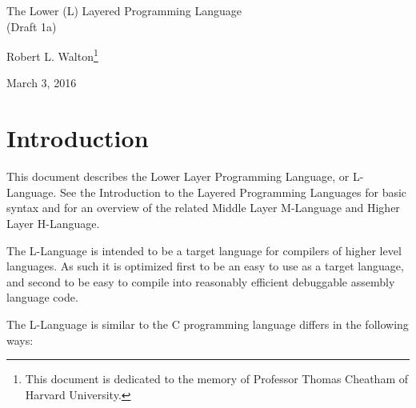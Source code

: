 \documentclass[12pt]{article}
\makeatletter
\renewcommand\tableofcontents{%
    \begin{list}{}%
	     {\setlength{\itemsep}{0in}%
	      \setlength{\topsep}{0in}%
	      \setlength{\parsep}{1ex}%
	      \setlength{\labelwidth}{0in}%
	      \setlength{\baselineskip}{1.5ex}%
	      \setlength{\leftmargin}{1.0in}%
	      \setlength{\rightmargin}{1.0in}}%
    \item\@starttoc{toc}%
    \end{list}}
\makeatother
\begin{document}
        
\begin{center}

{\Large
The Lower (L) Layered Programming Language \\[0.5ex]
(Draft 1a)}

\medskip

Robert L. Walton\footnote{This document is dedicated to the memory
of Professor Thomas Cheatham of Harvard University.}

March 3, 2016
 
\end{center}

{\small \tableofcontents}

\newpage

\section{Introduction}

This document describes the Lower Layer Programming Language, or
L-Language.  See the Introduction to the Layered
Programming Languages for basic syntax and for an overview of the related
Middle Layer M-Language and Higher Layer H-Language.

The L-Language is intended to be a target language for compilers of
higher level languages.  As such it is optimized first to be an easy to 
use as a target language, and second to be easy to
compile into reasonably efficient debuggable assembly language code.

The L-Language is similar to the C programming language
differs in the following ways:
\end{document}
